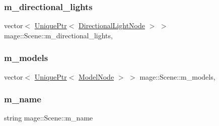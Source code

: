 \hypertarget{classmage_1_1_scene_a4546b3403a04ca8dcf116368a8bce001}{}\label{classmage_1_1_scene_a4546b3403a04ca8dcf116368a8bce001} 
\subsubsection{\texorpdfstring{m\+\_\+directional\+\_\+lights}{m\_directional\_lights}}
{\footnotesize\ttfamily vector$<$ \hyperlink{namespacemage_a3316d7143a973e37adf1110f2e80ca31}{Unique\+Ptr}$<$ \hyperlink{namespacemage_a7637b5351fc0f66a10badd80ebb35899}{Directional\+Light\+Node} $>$ $>$ mage\+::\+Scene\+::m\+\_\+directional\+\_\+lights\hspace{0.3cm}{\ttfamily [mutable]}, {\ttfamily [private]}}

\hypertarget{classmage_1_1_scene_a84e7606151e92bffe591e5303e0b7d5e}{}\label{classmage_1_1_scene_a84e7606151e92bffe591e5303e0b7d5e} 
\subsubsection{\texorpdfstring{m\+\_\+models}{m\_models}}
{\footnotesize\ttfamily vector$<$ \hyperlink{namespacemage_a3316d7143a973e37adf1110f2e80ca31}{Unique\+Ptr}$<$ \hyperlink{classmage_1_1_model_node}{Model\+Node} $>$ $>$ mage\+::\+Scene\+::m\+\_\+models\hspace{0.3cm}{\ttfamily [mutable]}, {\ttfamily [private]}}

\hypertarget{classmage_1_1_scene_a6cc8cb08b1853c4e3063b33a94e8fb47}{}\label{classmage_1_1_scene_a6cc8cb08b1853c4e3063b33a94e8fb47} 
\subsubsection{\texorpdfstring{m\+\_\+name}{m\_name}}
{\footnotesize\ttfamily string mage\+::\+Scene\+::m\+\_\+name\hspace{0.3cm}{\ttfamily [private]}}

\hypertarget{classmage_1_1_scene_a308f40aa62dbfc519ab9c9c2a123a62c}{}\label{classmage_1_1_scene_a308f40aa62dbfc519ab9c9c2a123a62c} 
